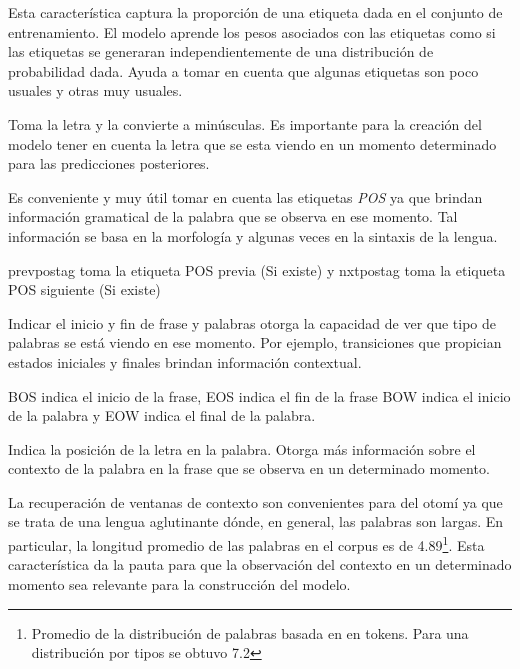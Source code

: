\documentclass[letterpaper,12pt,oneside]{book}
\newcommand{\note}[4][]{\todo[author=#2,color=#3,size=\scriptsize,fancyline,caption={},#1]{#4}} %
\newcommand{\vic}[2][]{\note[#1]{Vic}{orange!40}{#2}}
\newcommand{\Vic}[2][]{\vic[inline,#1]{#2}\noindent}
\theoremstyle{definition}
\begin{document}
\Vic{Pasar a formato de description}
\begin{description} \label{feature_functions_descr}
    \item[Bias:] Esta característica captura la proporción de una etiqueta dada en el conjunto de entrenamiento. El modelo aprende los pesos asociados con las etiquetas como si las etiquetas se generaran independientemente de una distribución de probabilidad dada. Ayuda a tomar en cuenta que algunas etiquetas son poco usuales y otras muy usuales.
    
    \item[\textsf{letterLowercase}:] Toma la letra y la convierte a minúsculas. Es importante para la creación del modelo tener en cuenta la letra que se esta viendo en un momento determinado para las predicciones posteriores. 
    
    \item[\textsf{prevpostag} y \textsf{nxtpostag}:] Es conveniente y muy útil tomar en cuenta las etiquetas \textit{POS} ya que brindan información gramatical de la palabra que se observa en ese momento. Tal información se basa en la morfología y algunas veces en la sintaxis de la lengua.

    \textsf{prevpostag} toma la etiqueta POS previa (Si existe) y \textsf{nxtpostag} toma la etiqueta POS siguiente (Si existe)
    
    \item[\textsf{BOS}, \textsf{EOS}, \textsf{BOW} y \textsf{EOW}:] Indicar el inicio y fin de frase y palabras otorga la capacidad de ver que tipo de palabras se está viendo en ese momento. Por ejemplo, transiciones que propician estados iniciales y finales brindan información contextual.

    \textsf{BOS} indica el inicio de la frase, \textsf{EOS} indica el fin de la frase \textsf{BOW} indica el inicio de la palabra y \textsf{EOW} indica el final de la palabra.
    
    \item[\textsf{letterposition}:] Indica la posición de la letra en la palabra. Otorga más información sobre el contexto de la palabra en la frase que se observa en un determinado momento.
    
    \item[\textsf{prev<n>letters} y \textsf{nxt<n>letters}:] La recuperación de ventanas de contexto son convenientes para del otomí ya que se trata de una lengua aglutinante dónde, en general, las palabras son largas. En particular, la longitud promedio de las palabras en el corpus es de 4.89\footnote{Promedio de la distribución de palabras basada en  en tokens. Para una distribución por tipos se obtuvo 7.2}. Esta característica da la pauta para que la observación del contexto en un determinado momento sea relevante para la construcción del modelo.
    

\end{description}
\end{document}
